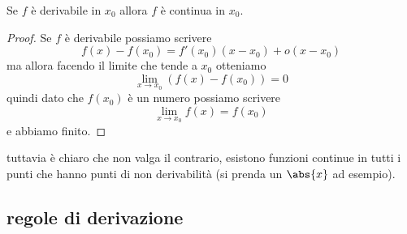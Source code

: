 \documentclass[11pt]{scrartcl}
\begin{document}
	\begin{proposition}
		Se $f$ è derivabile in $x_0$ allora $f$ è continua in $x_0$.
	\end{proposition}
	\begin{proof}
		Se $f$ è derivabile possiamo scrivere
		$$f(x)-f(x_0)=f'(x_0)(x-x_0)+o(x-x_0)$$
		ma allora facendo il limite che tende a $x_0$ otteniamo
		$$\lim_{x\to x_0}(f(x)-f(x_0))=0$$
		quindi dato che $f(x_0)$ è un numero possiamo scrivere
		$$\lim_{x\to x_0}f(x)=f(x_0)$$
		e abbiamo finito.
	\end{proof}
	tuttavia è chiaro che non valga il contrario, esistono funzioni continue in tutti i punti che hanno punti di non derivabilità (si prenda un $\abs{x}$ ad esempio).
	
	\subsection{regole di derivazione}
	
\end{document}
